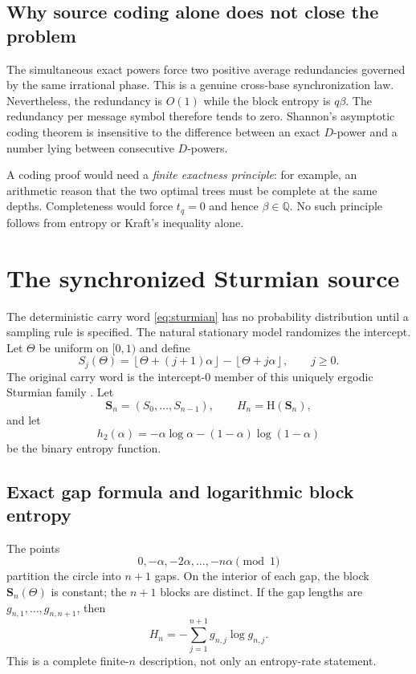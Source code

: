 \documentclass[11pt,oneside]{article}
\theoremstyle{definition}
\theoremstyle{remark}
\newcommand{\Q}{\mathbb{Q}}
\newcommand{\HH}{\mathrm{H}}
\newcommand{\floor}[1]{\left\lfloor #1\right\rfloor}
\begin{document}
\subsection{Why source coding alone does not close the problem}

The simultaneous exact powers force two positive average redundancies governed by the same irrational phase.  This is a genuine cross-base synchronization law.  Nevertheless, the redundancy is $O(1)$ while the block entropy is $q\beta$.  The redundancy per message symbol therefore tends to zero.  Shannon's asymptotic coding theorem \cite{Shannon1948,CoverThomas2006} is insensitive to the difference between an exact $D$-power and a number lying between consecutive $D$-powers.

A coding proof would need a \emph{finite exactness principle}: for example, an arithmetic reason that the two optimal trees must be complete at the same depths.  Completeness would force $t_q=0$ and hence $\beta\in\Q$.  No such principle follows from entropy or Kraft's inequality alone.

\section{The synchronized Sturmian source}\label{sec:sturmian-entropy}

The deterministic carry word \eqref{eq:sturmian} has no probability distribution until a sampling rule is specified.  The natural stationary model randomizes the intercept.  Let $\Theta$ be uniform on $[0,1)$ and define
\begin{equation}\label{eq:phase-word}
 S_j(\Theta)=\floor{\Theta+(j+1)\alpha}-\floor{\Theta+j\alpha},
 \qquad j\geq0.
\end{equation}
The original carry word is the intercept-$0$ member of this uniquely ergodic Sturmian family \cite{Lothaire2002}.  Let
\[
 \mathbf S_n=(S_0,\ldots,S_{n-1}),\qquad H_n=\HH(\mathbf S_n),
\]
and let
\[
 h_2(\alpha)=-\alpha\log\alpha-(1-\alpha)\log(1-\alpha)
\]
be the binary entropy function.

\subsection{Exact gap formula and logarithmic block entropy}

The points
\begin{equation}\label{eq:endpoints}
 0,-\alpha,-2\alpha,\ldots,-n\alpha\pmod1
\end{equation}
partition the circle into $n+1$ gaps.  On the interior of each gap, the block $\mathbf S_n(\Theta)$ is constant; the $n+1$ blocks are distinct.  If the gap lengths are $g_{n,1},\ldots,g_{n,n+1}$, then
\begin{equation}\label{eq:gap-entropy}
  H_n=-\sum_{j=1}^{n+1}g_{n,j}\log g_{n,j}.
\end{equation}
This is a complete finite-$n$ description, not only an entropy-rate statement.
\end{document}
